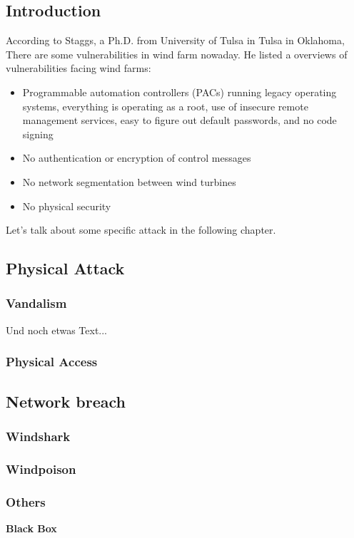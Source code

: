 \documentclass[twosided,a4,10pt]{article}
\begin{document}
\begin{multicols}{2}
\subsection{Introduction}
 According to Staggs, a Ph.D. from University of Tulsa in Tulsa in Oklahoma, There are some vulnerabilities in wind farm nowaday. He listed a overviews of vulnerabilities facing wind farms:
 \begin{itemize}
     \item Programmable automation controllers (PACs) running legacy operating systems, everything is operating as a root, use of insecure remote management services, easy to figure out default passwords, and no code signing
    \item	No authentication or encryption of control messages
    \item	No network segmentation between wind turbines
    \item	No physical security
 \end{itemize}
 Let's talk about some specific attack in the following chapter.


\subsection{Physical Attack}
 \subsubsection{Vandalism}
 Und noch etwas Text... \cite{muster} \newline
 \lipsum[1]
 \subsubsection{Physical Access}
 \lipsum[1]
 
\subsection{Network breach}
 \subsubsection{Windshark}
 \lipsum[1]
 \subsubsection{Windpoison}
 \lipsum[1]
 \subsubsection{Others}
 \textbf{Black Box}
 \lipsum[1]
 

\end{multicols}
\end{document}
